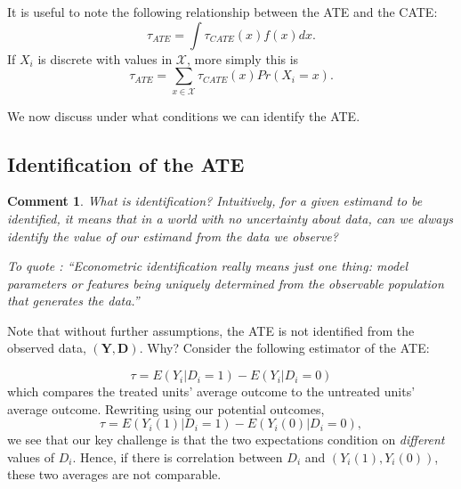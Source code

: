 \documentclass{tufte-handout}
\theoremstyle{break}
\newtheorem{cmt}{Comment}
\newcommand{\bY}{\mathbf{Y}}
\newcommand{\bD}{\mathbf{D}}
\begin{document}
It is useful to note the following relationship between the ATE and the CATE:
\begin{equation*}
  \tau_{ATE} = \int \tau_{CATE}(x) f(x) dx.
\end{equation*}
If $X_{i}$ is discrete with values in $\mathcal{X}$, more simply this is
\begin{equation*}
  \tau_{ATE} = \sum_{x \in \mathcal{X}} \tau_{CATE}(x) Pr(X_{i} = x).
\end{equation*}

We now discuss under what conditions we can identify the ATE. 

\subsection{Identification of the ATE}

\begin{boxF}
  \begin{cmt}
    What is identification? Intuitively, for a given estimand to be identified, it means that in a world with no uncertainty about data, can we always identify the value of our estimand from the data we observe?

    To quote \citet{lewbel2019identification}: ``Econometric identification really means just one thing: model parameters or features being uniquely determined from the observable population that generates the data.''

    \end{cmt}
  \end{boxF}

Note that without further assumptions, the ATE is not identified from the observed data, $(\bY, \bD)$. Why? Consider the following estimator of the ATE:

\begin{equation}
  \label{eq:ate_naive}
  \tau = E(Y_{i} | D_{i} = 1) - E(Y_{i} | D_{i} = 0)
\end{equation}
which compares the treated units' average outcome to the untreated units' average outcome. Rewriting using our potential outcomes,
\begin{equation*}
  \tau = E(Y_{i}(1) | D_{i} = 1) - E(Y_{i}(0) | D_{i} = 0),
\end{equation*}
we see that our key challenge is that the two expectations condition on \emph{different} values of $D_{i}$. Hence, if there is correlation between $D_{i}$ and $(Y_{i}(1), Y_{i}(0))$, these two averages are not comparable. 
\end{document}
